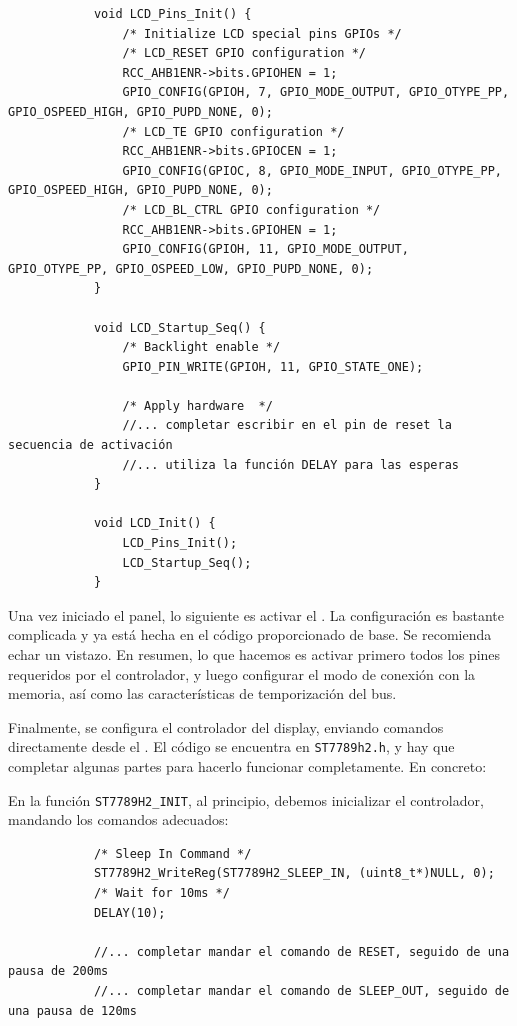 \documentclass[../main.tex]{subfiles}
\begin{document}
        \begin{lstlisting}
            void LCD_Pins_Init() {
                /* Initialize LCD special pins GPIOs */
                /* LCD_RESET GPIO configuration */
                RCC_AHB1ENR->bits.GPIOHEN = 1;
                GPIO_CONFIG(GPIOH, 7, GPIO_MODE_OUTPUT, GPIO_OTYPE_PP, GPIO_OSPEED_HIGH, GPIO_PUPD_NONE, 0);
                /* LCD_TE GPIO configuration */
                RCC_AHB1ENR->bits.GPIOCEN = 1;
                GPIO_CONFIG(GPIOC, 8, GPIO_MODE_INPUT, GPIO_OTYPE_PP, GPIO_OSPEED_HIGH, GPIO_PUPD_NONE, 0);
                /* LCD_BL_CTRL GPIO configuration */
                RCC_AHB1ENR->bits.GPIOHEN = 1;
                GPIO_CONFIG(GPIOH, 11, GPIO_MODE_OUTPUT, GPIO_OTYPE_PP, GPIO_OSPEED_LOW, GPIO_PUPD_NONE, 0);
            }

            void LCD_Startup_Seq() {
                /* Backlight enable */
                GPIO_PIN_WRITE(GPIOH, 11, GPIO_STATE_ONE);

                /* Apply hardware  */
                //... completar escribir en el pin de reset la secuencia de activación
                //... utiliza la función DELAY para las esperas
            }

            void LCD_Init() {
                LCD_Pins_Init();
                LCD_Startup_Seq();
            }
        \end{lstlisting}

        Una vez iniciado el panel, lo siguiente es activar el . La configuración es bastante complicada y ya está hecha en el código proporcionado de base. Se recomienda echar un vistazo. En resumen, lo que hacemos es activar primero todos los pines requeridos por el controlador, y luego configurar el modo de conexión con la memoria, así como las características de temporización del bus.

        Finalmente, se configura el controlador del display, enviando comandos directamente desde el . El código se encuentra en \texttt{ST7789h2.h}, y hay que completar algunas partes para hacerlo funcionar completamente. En concreto:

        En la función \texttt{ST7789H2\_INIT}, al principio, debemos inicializar el controlador, mandando los comandos adecuados:

        \begin{lstlisting}
            /* Sleep In Command */
            ST7789H2_WriteReg(ST7789H2_SLEEP_IN, (uint8_t*)NULL, 0);
            /* Wait for 10ms */
            DELAY(10);

            //... completar mandar el comando de RESET, seguido de una pausa de 200ms
            //... completar mandar el comando de SLEEP_OUT, seguido de una pausa de 120ms
        \end{lstlisting}
\end{document}
